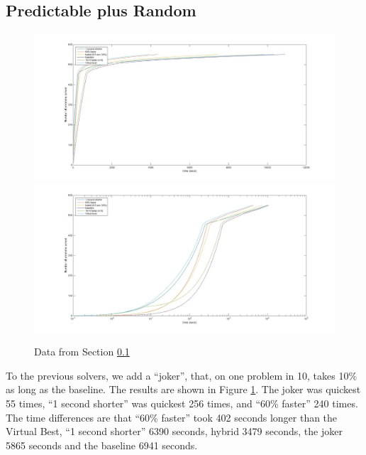\documentclass{easychair}
\begin{document}
\subsection{Predictable plus Random}\label{sec:P+J}
\begin{figure}[h]
\caption{Data from Section \ref{sec:P+J}\label{Fig:S4}}
\hbox{\hskip-60pt\includegraphics[scale=0.35]{Fig4a.jpg}}
\hbox{\hskip-60pt\includegraphics[scale=0.35]{Fig4b.jpg}}
\end{figure}
To the previous solvers, we add a ``joker'', that, on one problem in 10, takes 10\% as long as the baseline.  The results are shown in Figure \ref{Fig:S4}. The joker was quickest 55 times, ``1 second shorter'' was quickest 256 times, and ``60\% faster'' 240 times. The time differences are that ``60\% faster'' took 402 seconds longer than the Virtual Best, ``1 second shorter''  6390 seconds, hybrid 3479 seconds, the joker 5865 seconds and the baseline 6941 seconds.
\end{document}
